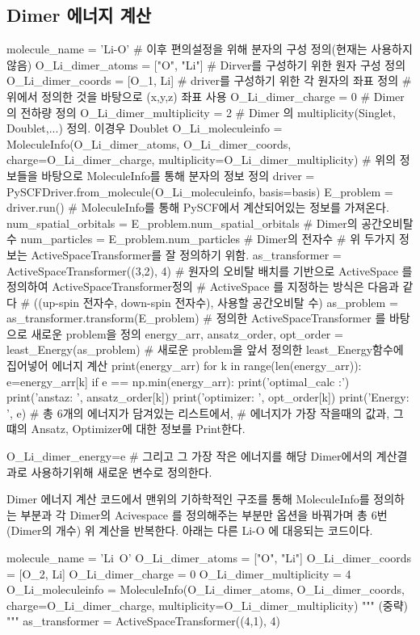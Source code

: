 \documentclass[11pt]{article}
\begin{document}
\subsection{Dimer 에너지 계산}
\begin{CodeBox}[title={Example: Python snippet}]
molecule_name = 'Li-O'
# 이후 편의설정을 위해 분자의 구성 정의(현재는 사용하지 않음)
O_Li_dimer_atoms = ["O", "Li"]
# Dirver를 구성하기 위한 원자 구성 정의
O_Li_dimer_coords = [O_1, Li]
# driver를 구성하기 위한 각 원자의 좌표 정의 
# 위에서 정의한 것을 바탕으로 (x,y,z) 좌표 사용 
O_Li_dimer_charge = 0
# Dimer의 전하량 정의
O_Li_dimer_multiplicity = 2
# Dimer 의 multiplicity(Singlet, Doublet,...) 정의. 이경우 Doublet
O_Li_moleculeinfo = MoleculeInfo(O_Li_dimer_atoms, O_Li_dimer_coords, charge=O_Li_dimer_charge, multiplicity=O_Li_dimer_multiplicity)
# 위의 정보들을 바탕으로 MoleculeInfo를 통해 분자의 정보 정의
driver = PySCFDriver.from_molecule(O_Li_moleculeinfo, basis=basis)
E_problem = driver.run()
# MoleculeInfo를 통해 PySCF에서 계산되어있는 정보를 가져온다.
num_spatial_orbitals = E_problem.num_spatial_orbitals
# Dimer의 공간오비탈 수 
num_particles = E_problem.num_particles
# Dimer의 전자수 
# 위 두가지 정보는 ActiveSpaceTransformer를 잘 정의하기 위함. 
as_transformer = ActiveSpaceTransformer((3,2), 4)
# 원자의 오비탈 배치를 기반으로 ActiveSpace 를 정의하여 ActiveSpaceTransformer정의
# ActiveSpace 를 지정하는 방식은 다음과 같다 
# ((up-spin 전자수, down-spin 전자수), 사용할 공간오비탈 수)
as_problem = as_transformer.transform(E_problem)
# 정의한 ActiveSpaceTransformer 를 바탕으로 새로운 problem을 정의
energy_arr, ansatz_order, opt_order = least_Energy(as_problem)
# 새로운 problem을 앞서 정의한 least_Energy함수에 집어넣어 에너지 계산 
print(energy_arr)
for k in range(len(energy_arr)):
    e=energy_arr[k]
    if e == np.min(energy_arr):
        print('optimal_calc :')
        print('anstaz: ', ansatz_order[k])
        print('optimizer: ', opt_order[k])
        print('Energy: ', e)
# 총 6개의 에너지가 담겨있는 리스트에서, 
# 에너지가 가장 작을때의 값과, 그떄의 Ansatz, Optimizer에 대한 정보를 Print한다. 

O_Li_dimer_energy=e
# 그리고 그 가장 작은 에너지를 해당 Dimer에서의 계산결과로 사용하기위해 새로운 변수로 정의한다. 
\end{CodeBox} 

Dimer 에너지 계산 코드에서 맨위의 기하학적인 구조를 통해 MoleculeInfo를 정의하는 부분과 각 Dimer의 Acivespace 를 정의해주는 부분만 옵션을 바꿔가며 총 6번(Dimer의 개수) 위 계산을 반복한다. 아래는 다른 Li-O 에 대응되는 코드이다. 
\begin{CodeBox}[title={Example: Python snippet}]
molecule_name = 'Li~O'
O_Li_dimer_atoms = ["O", "Li"]
O_Li_dimer_coords = [O_2, Li]
O_Li_dimer_charge = 0
O_Li_dimer_multiplicity = 4
O_Li_moleculeinfo = MoleculeInfo(O_Li_dimer_atoms, O_Li_dimer_coords, charge=O_Li_dimer_charge, multiplicity=O_Li_dimer_multiplicity)
"""
(중략)
"""
as_transformer = ActiveSpaceTransformer((4,1), 4)

\end{CodeBox} 
\end{document}
